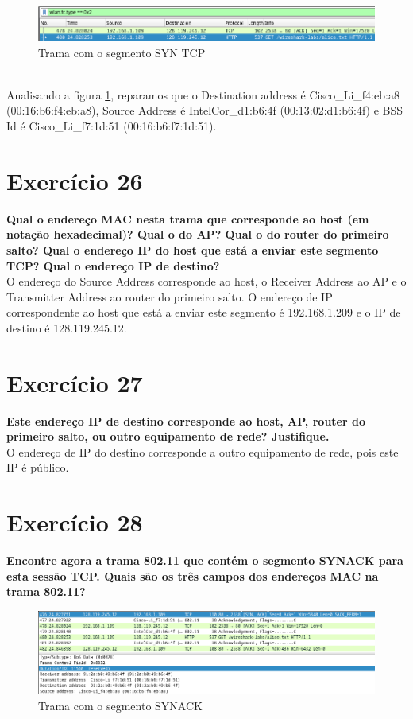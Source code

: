 \documentclass[a4paper]{report}
\begin{document}
\begin{figure}[H]
    \centering 
    \includegraphics[width=\textwidth]{images/tramaEx25.png}  
    \caption{Trama com o segmento SYN TCP}
    \label{fig:tramaEx25}
\end{figure}\\

Analisando a figura \ref{fig:tramaEx25}, reparamos que o Destination address é
Cisco_Li_f4:eb:a8 (00:16:b6:f4:eb:a8), Source Address é IntelCor_d1:b6:4f 
(00:13:02:d1:b6:4f) e BSS Id é Cisco_Li_f7:1d:51 (00:16:b6:f7:1d:51).

\section{Exercício 26}
\textbf{Qual o endereço MAC nesta trama que corresponde ao host (em notação
    hexadecimal)? Qual o do AP? Qual o do router do primeiro salto? Qual o
    endereço IP do host que está a enviar este segmento TCP? Qual o endereço IP
    de destino?}\\

O endereço do Source Address corresponde ao host, o Receiver Address ao AP e o 
Transmitter Address ao router do primeiro salto. O endereço de IP correspondente
ao host que está a enviar este segmento é 192.168.1.209 e o IP de destino é
128.119.245.12.

\section{Exercício 27}
\textbf{Este endereço IP de destino corresponde ao host, AP, router do primeiro
    salto, ou outro equipamento de rede? Justifique.}\\

O endereço de IP do destino corresponde a outro equipamento de rede, pois
este IP é público.

\section{Exercício 28}
\textbf{Encontre agora a trama 802.11 que contém o segmento SYNACK para esta
    sessão TCP. Quais são os três campos dos endereços MAC na trama 802.11?}\\

\begin{figure}[H]
    \centering 
    \includegraphics[width=\textwidth]{images/tramaEx28.png}  
    \caption{Trama com o segmento SYNACK}
    \label{fig:tramaEx28}
\end{figure}\\
\end{document}
